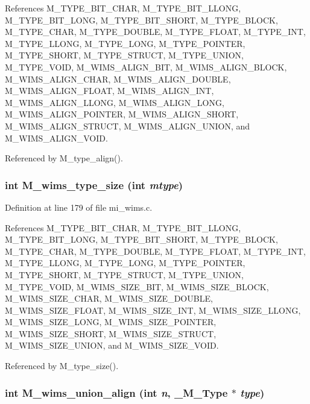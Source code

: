References M\_\-TYPE\_\-BIT\_\-CHAR, M\_\-TYPE\_\-BIT\_\-LLONG, M\_\-TYPE\_\-BIT\_\-LONG, M\_\-TYPE\_\-BIT\_\-SHORT, M\_\-TYPE\_\-BLOCK, M\_\-TYPE\_\-CHAR, M\_\-TYPE\_\-DOUBLE, M\_\-TYPE\_\-FLOAT, M\_\-TYPE\_\-INT, M\_\-TYPE\_\-LLONG, M\_\-TYPE\_\-LONG, M\_\-TYPE\_\-POINTER, M\_\-TYPE\_\-SHORT, M\_\-TYPE\_\-STRUCT, M\_\-TYPE\_\-UNION, M\_\-TYPE\_\-VOID, M\_\-WIMS\_\-ALIGN\_\-BIT, M\_\-WIMS\_\-ALIGN\_\-BLOCK, M\_\-WIMS\_\-ALIGN\_\-CHAR, M\_\-WIMS\_\-ALIGN\_\-DOUBLE, M\_\-WIMS\_\-ALIGN\_\-FLOAT, M\_\-WIMS\_\-ALIGN\_\-INT, M\_\-WIMS\_\-ALIGN\_\-LLONG, M\_\-WIMS\_\-ALIGN\_\-LONG, M\_\-WIMS\_\-ALIGN\_\-POINTER, M\_\-WIMS\_\-ALIGN\_\-SHORT, M\_\-WIMS\_\-ALIGN\_\-STRUCT, M\_\-WIMS\_\-ALIGN\_\-UNION, and M\_\-WIMS\_\-ALIGN\_\-VOID.

Referenced by M\_\-type\_\-align().
\subsubsection{\setlength{\rightskip}{0pt plus 5cm}int M\_\-wims\_\-type\_\-size (int {\em mtype})}\label{m__wims_8h_82067885f67db7075a7f0cec975bbe2e}




Definition at line 179 of file mi\_\-wims.c.

References M\_\-TYPE\_\-BIT\_\-CHAR, M\_\-TYPE\_\-BIT\_\-LLONG, M\_\-TYPE\_\-BIT\_\-LONG, M\_\-TYPE\_\-BIT\_\-SHORT, M\_\-TYPE\_\-BLOCK, M\_\-TYPE\_\-CHAR, M\_\-TYPE\_\-DOUBLE, M\_\-TYPE\_\-FLOAT, M\_\-TYPE\_\-INT, M\_\-TYPE\_\-LLONG, M\_\-TYPE\_\-LONG, M\_\-TYPE\_\-POINTER, M\_\-TYPE\_\-SHORT, M\_\-TYPE\_\-STRUCT, M\_\-TYPE\_\-UNION, M\_\-TYPE\_\-VOID, M\_\-WIMS\_\-SIZE\_\-BIT, M\_\-WIMS\_\-SIZE\_\-BLOCK, M\_\-WIMS\_\-SIZE\_\-CHAR, M\_\-WIMS\_\-SIZE\_\-DOUBLE, M\_\-WIMS\_\-SIZE\_\-FLOAT, M\_\-WIMS\_\-SIZE\_\-INT, M\_\-WIMS\_\-SIZE\_\-LLONG, M\_\-WIMS\_\-SIZE\_\-LONG, M\_\-WIMS\_\-SIZE\_\-POINTER, M\_\-WIMS\_\-SIZE\_\-SHORT, M\_\-WIMS\_\-SIZE\_\-STRUCT, M\_\-WIMS\_\-SIZE\_\-UNION, and M\_\-WIMS\_\-SIZE\_\-VOID.

Referenced by M\_\-type\_\-size().
\subsubsection{\setlength{\rightskip}{0pt plus 5cm}int M\_\-wims\_\-union\_\-align (int {\em n}, \bf{\_\-M\_\-Type} $\ast$ {\em type})}\label{m__wims_8h_b39ca8b04b697536e7f8e25b1688bfb7}




